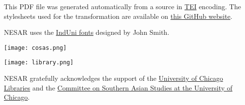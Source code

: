 \noindent\begin{minipage}[t]{0.48\textwidth}
\bigskip
\end{minipage}\hfill
\begin{minipage}[t]{0.48\textwidth}
\begingroup
\tiny
\noindent This PDF file was generated automatically from a source in \href{https://tei-c.org/}{TEI} encoding. The stylesheets used for the transformation are available on \href{https://github.com/nesar-journal/nesar-stylesheets}{this GitHub website}.\medskip

\noindent NESAR uses the \href{https://bombay.indology.info/software/fonts/induni/index.html}{IndUni fonts} designed by John Smith.\medskip

\begin{center}
\texttt{[image: cosas.png]}\medskip

\texttt{[image: library.png]}
\end{center}\medskip

\noindent NESAR gratefully acknowledges the support of the \href{https://www.lib.uchicago.edu/}{University of Chicago Libraries} and the \href{https://southernasia.uchicago.edu/}{Committee on Southern Asian Studies at the University of Chicago}.\vfill

\endgroup
\end{minipage}
\endgroup
